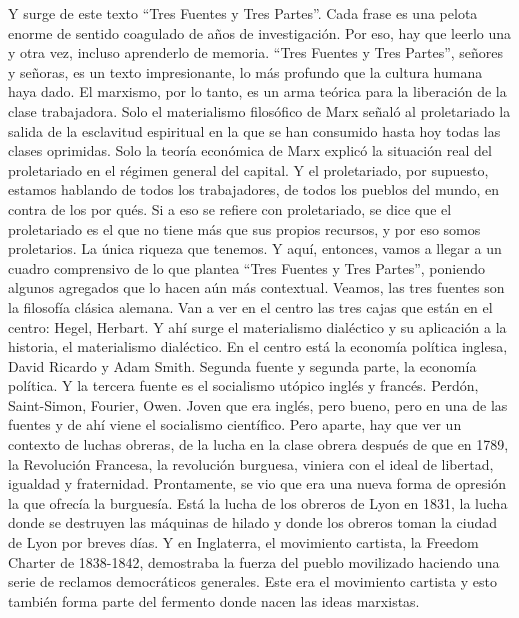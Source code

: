 \documentclass[
  a4paper,
]{article}
\begin{document}
Y surge de este texto ``Tres Fuentes y Tres Partes''. Cada frase es una
pelota enorme de sentido coagulado de años de investigación. Por eso,
hay que leerlo una y otra vez, incluso aprenderlo de memoria. ``Tres
Fuentes y Tres Partes'', señores y señoras, es un texto impresionante,
lo más profundo que la cultura humana haya dado. El marxismo, por lo
tanto, es un arma teórica para la liberación de la clase trabajadora.
Solo el materialismo filosófico de Marx señaló al proletariado la salida
de la esclavitud espiritual en la que se han consumido hasta hoy todas
las clases oprimidas. Solo la teoría económica de Marx explicó la
situación real del proletariado en el régimen general del capital. Y el
proletariado, por supuesto, estamos hablando de todos los trabajadores,
de todos los pueblos del mundo, en contra de los por qués. Si a eso se
refiere con proletariado, se dice que el proletariado es el que no tiene
más que sus propios recursos, y por eso somos proletarios. La única
riqueza que tenemos. Y aquí, entonces, vamos a llegar a un cuadro
comprensivo de lo que plantea ``Tres Fuentes y Tres Partes'', poniendo
algunos agregados que lo hacen aún más contextual. Veamos, las tres
fuentes son la filosofía clásica alemana. Van a ver en el centro las
tres cajas que están en el centro: Hegel, Herbart. Y ahí surge el
materialismo dialéctico y su aplicación a la historia, el materialismo
dialéctico. En el centro está la economía política inglesa, David
Ricardo y Adam Smith. Segunda fuente y segunda parte, la economía
política. Y la tercera fuente es el socialismo utópico inglés y francés.
Perdón, Saint-Simon, Fourier, Owen. Joven que era inglés, pero bueno,
pero en una de las fuentes y de ahí viene el socialismo científico. Pero
aparte, hay que ver un contexto de luchas obreras, de la lucha en la
clase obrera después de que en 1789, la Revolución Francesa, la
revolución burguesa, viniera con el ideal de libertad, igualdad y
fraternidad. Prontamente, se vio que era una nueva forma de opresión la
que ofrecía la burguesía. Está la lucha de los obreros de Lyon en 1831,
la lucha donde se destruyen las máquinas de hilado y donde los obreros
toman la ciudad de Lyon por breves días. Y en Inglaterra, el movimiento
cartista, la Freedom Charter de 1838-1842, demostraba la fuerza del
pueblo movilizado haciendo una serie de reclamos democráticos generales.
Este era el movimiento cartista y esto también forma parte del fermento
donde nacen las ideas marxistas.
\end{document}
